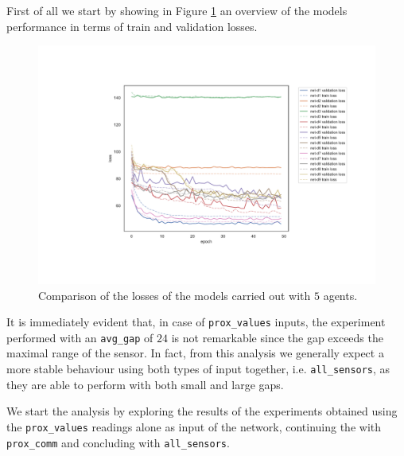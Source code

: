 First of all we start by showing in Figure \ref{fig:distloss} an overview of the 
models performance in terms of train and validation losses. 
\begin{figure}[!htb]
	\centering
	\includegraphics[width=.8\textwidth]{contents/images/task1/loss-distributed-all@}%
	\caption[Comparison of losses of the first set of 
	experiments.]{Comparison of 
	the losses of the models carried out with $5$ agents.}
	\label{fig:distloss}
\end{figure}
It is immediately evident that, in case of \texttt{prox\_values} inputs, the 
experiment performed with an \texttt{avg\_gap} of $24$ is not remarkable since 
the gap exceeds the maximal range of the sensor. In fact, from this analysis we 
generally expect a more stable behaviour using both types of input together, i.e. 
\texttt{all\_sensors}, as they are able to perform with both small and large gaps.

We start the analysis by exploring the results of the experiments obtained 
using the \texttt{prox\_values} readings alone as input of the network, continuing 
the with \texttt{prox\_comm} and concluding with \texttt{all\_sensors}.

